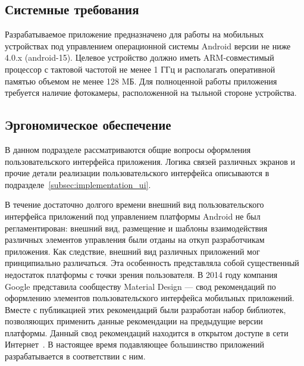 


\subsection{Системные требования}

Разрабатываемое приложение предназначено для работы на мобильных устройствах
под управлением операционной системы Android версии не ниже 4.0.x (android-15).
Целевое устройство должно иметь ARM-совместимый процессор с тактовой частотой не менее
1 ГГц и располагать оперативной памятью объемом не менее 128 MБ.
Для полноценной работы приложения требуется наличие фотокамеры,
расположенной на тыльной стороне устройства.

\subsection{Эргономическое обеспечение}

В данном подразделе рассматриваются общие вопросы оформления
пользовательского интерфейса приложения.
Логика связей различных экранов и прочие детали реализации
пользовательского интерфейса описываются в
подразделе~\ref{subsec:implementation_ui}.

В течение достаточно долгого времени внешний вид пользовательского интерфейса
приложений под управлением платформы Android не был регламентирован:
внешний вид, размещение и шаблоны взаимодействия различных элементов управления
были отданы на откуп разработчикам приложения.
Как следствие, внешний вид различных приложений мог принципиально различаться.
Эта особенность представляла собой существенный недостаток платформы
с точки зрения пользователя.
В 2014 году компания Google представила сообществу Material Design ---
свод рекомендаций по оформлению элементов пользовательского интерфейса
мобильных приложений. Вместе с публикацией этих рекомендаций были
разработан набор библиотек, позволяющих применить данные рекомендации
на предыдущие версии платформы.
Данный свод рекомендаций находится в открытом доступе в сети
Интернет~\cite{material_design}.
В настоящее время подавляющее большинство приложений разрабатывается
в соответствии с ним.


